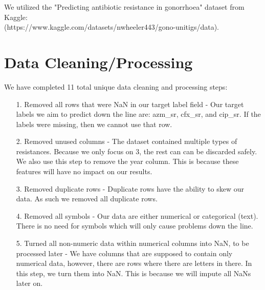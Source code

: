 \documentclass[manuscript,screen,review, nonacm]{acmart}
\begin{document}
    We utilized the "Predicting antibiotic resistance in gonorrhoea" dataset from Kaggle: \\
    (https://www.kaggle.com/datasets/nwheeler443/gono-unitigs/data). \\


\section{Data Cleaning/Processing}

    We have completed 11 total unique data cleaning and processing steps:

    \begin{itemize}
        \item[1.] Removed all rows that were NaN in our target label field - Our target labels we aim to predict down the line
        are: azm\_sr, cfx\_sr, and cip\_sr. If the labels were missing, then we cannot use that row.

        \item[2.] Removed unused columns - The dataset contained multiple types of resistances. Because we only focus on 3, the rest can
        can be discarded safely. We also use this step to remove the year column. This is because these features will have no impact on our results.

        \item[3.] Removed duplicate rows - Duplicate rows have the ability to skew our data. As such we removed all duplicate rows.
        
        \item[4.] Removed all symbols - Our data are either numerical or categorical (text). There is no need for symbols which will
        only cause problems down the line.

        \item[5.] Turned all non-numeric data within numerical columns into NaN, to be processed later - We have columns that are
        supposed to contain only numerical data, however, there are rows where there are letters in there. In this step, we turn them
        into NaN. This is because we will impute all NaNs later on.


\end{itemize}
\end{document}
